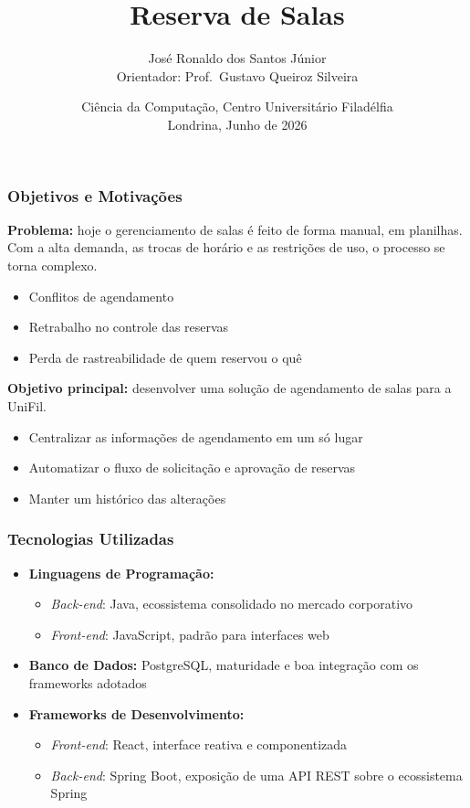 \documentclass[11pt, xcolor={dvipsnames}, usepdftitle=false]{beamer}
\title{Reserva de Salas}
\author{José Ronaldo dos Santos Júnior\\[2mm]{\small Orientador: Prof.\ Gustavo Queiroz Silveira}}
\date{Ciência da Computação, Centro Universitário Filadélfia\\[1mm]Londrina, Junho de 2026}
\begin{document}
\frame{\titlepage}

\begin{frame}
\frametitle{Objetivos e Motivações}
\textbf{Problema:} hoje o gerenciamento de salas é feito de forma manual, em planilhas. Com a alta demanda, as trocas de horário e as restrições de uso, o processo se torna complexo.
\begin{itemize}
\item Conflitos de agendamento
\item Retrabalho no controle das reservas
\item Perda de rastreabilidade de quem reservou o quê
\end{itemize}
\vspace{2mm}
\textbf{Objetivo principal:} desenvolver uma solução de agendamento de salas para a UniFil.
\begin{itemize}
\item Centralizar as informações de agendamento em um só lugar
\item Automatizar o fluxo de solicitação e aprovação de reservas
\item Manter um histórico das alterações
\end{itemize}
\end{frame}

\begin{frame}
\frametitle{Tecnologias Utilizadas}
\begin{itemize}
\item \textbf{Linguagens de Programação:}
\begin{itemize}
\item \textit{Back-end}: Java, ecossistema consolidado no mercado corporativo
\item \textit{Front-end}: JavaScript, padrão para interfaces web
\end{itemize}
\item \textbf{Banco de Dados:} PostgreSQL, maturidade e boa integração com os frameworks adotados
\item \textbf{Frameworks de Desenvolvimento:}
\begin{itemize}
\item \textit{Front-end}: React, interface reativa e componentizada
\item \textit{Back-end}: Spring Boot, exposição de uma API REST sobre o ecossistema Spring
\end{itemize}
\end{itemize}
\end{frame}
\end{document}
